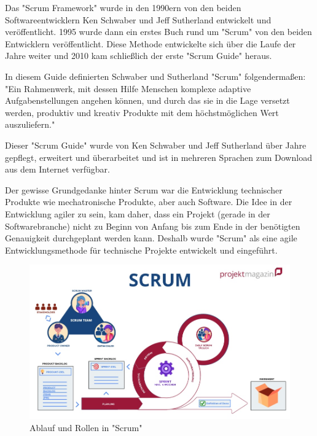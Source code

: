 \cite{AnwendungAgil}



Das "Scrum Framework" wurde in den 1990ern von den beiden Softwareentwicklern Ken Schwaber und Jeff Sutherland entwickelt und veröffentlicht. 1995 wurde dann ein erstes Buch rund um "Scrum" von den beiden Entwicklern veröffentlicht. Diese Methode entwickelte sich über die Laufe der Jahre weiter und 2010 kam schließlich der erste "Scrum Guide" heraus. \cite{Scrum}

In diesem Guide definierten Schwaber und Sutherland "Scrum" folgendermaßen: "Ein Rahmenwerk, mit dessen Hilfe Menschen komplexe adaptive Aufgabenstellungen angehen können, und durch das sie in die Lage versetzt werden, produktiv und kreativ Produkte mit dem höchstmöglichen Wert auszuliefern." \cite{Scrum}

Dieser "Scrum Guide" wurde von Ken Schwaber und Jeff Sutherland über Jahre gepflegt, erweitert und überarbeitet und ist in mehreren Sprachen zum Download aus dem Internet verfügbar. \cite{Scrum}

Der gewisse Grundgedanke hinter Scrum war die Entwicklung technischer Produkte wie mechatronische Produkte, aber auch Software. Die Idee in der Entwicklung agiler zu sein, kam daher, dass ein Projekt (gerade in der Softwarebranche) nicht zu Beginn von Anfang bis zum Ende in der benötigten Genauigkeit durchgeplant werden kann. Deshalb wurde "Scrum" als eine agile Entwicklungsmethode für technische Projekte entwickelt und eingeführt. \cite{Scrum}

\begin{figure}[H]
    \centering
    \includegraphics[width=\textwidth]{media/ProjectManagement/Scrum.jpg}
    \caption{Ablauf und Rollen in "Scrum" \cite{Scrum}}
\end{figure}

